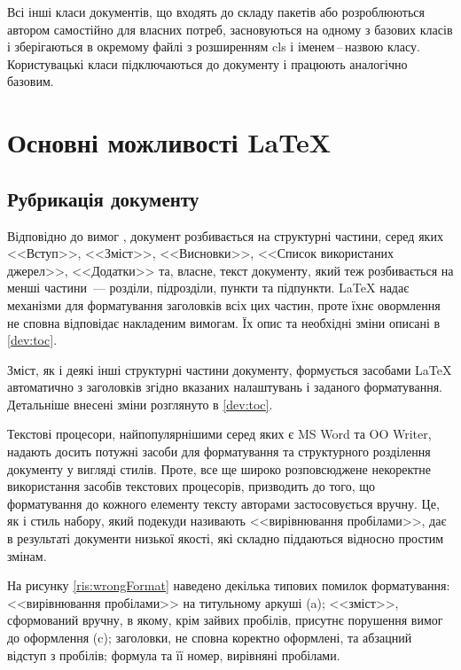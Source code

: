 Всі інші класи документів, що входять до складу пакетів або розроблюються автором самостійно для власних потреб, засновуються на одному з базових класів і зберігаються в окремому файлі з розширенням cls і іменем\,--\,назвою класу. Користувацькі класи підключаються до документу і працюють аналогічно базовим. 

\section{Основні можливості \LaTeX{}}

\subsection{Рубрикація документу}

Відповідно до вимог \cite{DSTU20153008}, документ розбивається на структурні частини, серед яких <<Вступ>>, <<Зміст>>, <<Висновки>>, <<Список використаних джерел>>, <<Додатки>> та, власне, текст документу, який теж розбивається на менші частини~--- розділи, підрозділи, пункти та підпункти. \LaTeX{} надає механізми для форматування заголовків всіх цих частин, проте їхнє овормлення не сповна відповідає накладеним вимогам. Їх опис та необхідні зміни описані в \ref{dev:toc}.

Зміст, як і деякі інші структурні частини документу, формується засобами \LaTeX{} автоматично з заголовків згідно вказаних налаштувань і заданого форматування. Детальніше внесені зміни розглянуто в \ref{dev:toc}.

Текстові процесори, найпопулярнішими серед яких є MS Word та OO Writer, надають досить потужні засоби для форматування та структурного розділення документу у вигляді стилів. Проте, все ще широко розповсюджене некоректне використання засобів текстових процесорів, призводить до того, що форматування до кожного елементу тексту авторами застосовується вручну. Це, як і стиль набору, який подекуди називають <<вирівнювання пробілами>>, дає в результаті документи низької якості, які складно піддаються відносно простим змінам. 

На рисунку \ref{ris:wrongFormat} наведено декілька типових помилок форматування: <<вирівнювання пробілами>> на титульному аркуші (a); <<зміст>>, сформований вручну, в якому, крім зайвих пробілів, присутнє порушення вимог до оформлення (c); заголовки, не сповна коректно оформлені, та абзацний відступ з пробілів; формула та її номер, вирівняні пробілами. 


